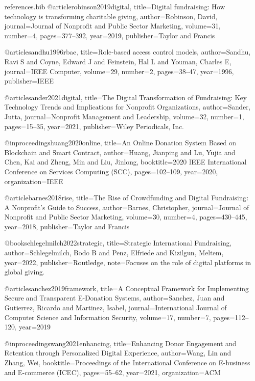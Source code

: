 ﻿\begin{filecontents}{references.bib}
@article{robinson2019digital,
  title={Digital fundraising: How technology is transforming charitable giving},
  author={Robinson, David},
  journal={Journal of Nonprofit and Public Sector Marketing},
  volume={31},
  number={4},
  pages={377--392},
  year={2019},
  publisher={Taylor and Francis}
}

@article{sandhu1996rbac,
  title={Role-based access control models},
  author={Sandhu, Ravi S and Coyne, Edward J and Feinstein, Hal L and Youman, Charles E},
  journal={IEEE Computer},
  volume={29},
  number={2},
  pages={38--47},
  year={1996},
  publisher={IEEE}
}

@article{sander2021digital,
  title={The Digital Transformation of Fundraising: Key Technology Trends and Implications for Nonprofit Organizations},
  author={Sander, Jutta},
  journal={Nonprofit Management and Leadership},
  volume={32},
  number={1},
  pages={15--35},
  year={2021},
  publisher={Wiley Periodicals, Inc.}
}

@inproceedings{huang2020online,
  title={An Online Donation System Based on Blockchain and Smart Contract},
  author={Huang, Jianping and Lu, Yujia and Chen, Kai and Zheng, Min and Liu, Jinlong},
  booktitle={2020 IEEE International Conference on Services Computing (SCC)},
  pages={102--109},
  year={2020},
  organization={IEEE}
}

@article{barnes2018rise,
  title={The Rise of Crowdfunding and Digital Fundraising: A Nonprofit's Guide to Success},
  author={Barnes, Christopher},
  journal={Journal of Nonprofit and Public Sector Marketing},
  volume={30},
  number={4},
  pages={430--445},
  year={2018},
  publisher={Taylor and Francis}
}

@book{schlegelmilch2022strategic,
  title={Strategic International Fundraising},
  author={Schlegelmilch, Bodo B and Penz, Elfriede and Kizilgun, Meltem},
  year={2022},
  publisher={Routledge},
  note={Focuses on the role of digital platforms in global giving.}
}

@article{sanchez2019framework,
  title={A Conceptual Framework for Implementing Secure and Transparent E-Donation Systems},
  author={Sanchez, Juan and Gutierrez, Ricardo and Martinez, Isabel},
  journal={International Journal of Computer Science and Information Security},
  volume={17},
  number={7},
  pages={112--120},
  year={2019}
}

@inproceedings{wang2021enhancing,
  title={Enhancing Donor Engagement and Retention through Personalized Digital Experience},
  author={Wang, Lin and Zhang, Wei},
  booktitle={Proceedings of the International Conference on E-business and E-commerce (ICEC)},
  pages={55--62},
  year={2021},
  organization={ACM}
}


\end{filecontents}
